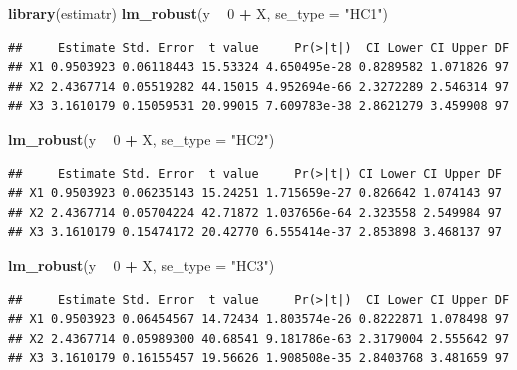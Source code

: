 \documentclass[]{article}
\newenvironment{Shaded}{\begin{snugshade}}{\end{snugshade}}
\newcommand{\DataTypeTok}[1]{\textcolor[rgb]{0.13,0.29,0.53}{#1}}
\newcommand{\DecValTok}[1]{\textcolor[rgb]{0.00,0.00,0.81}{#1}}
\newcommand{\KeywordTok}[1]{\textcolor[rgb]{0.13,0.29,0.53}{\textbf{#1}}}
\newcommand{\NormalTok}[1]{#1}
\newcommand{\OperatorTok}[1]{\textcolor[rgb]{0.81,0.36,0.00}{\textbf{#1}}}
\newcommand{\StringTok}[1]{\textcolor[rgb]{0.31,0.60,0.02}{#1}}
\begin{document}
\begin{Shaded}
\begin{Highlighting}[]
\KeywordTok{library}\NormalTok{(estimatr)}
\KeywordTok{lm_robust}\NormalTok{(y }\OperatorTok{~}\StringTok{ }\DecValTok{0} \OperatorTok{+}\StringTok{ }\NormalTok{X, }\DataTypeTok{se_type =} \StringTok{"HC1"}\NormalTok{)}
\end{Highlighting}
\end{Shaded}

\begin{verbatim}
##     Estimate Std. Error  t value     Pr(>|t|)  CI Lower CI Upper DF
## X1 0.9503923 0.06118443 15.53324 4.650495e-28 0.8289582 1.071826 97
## X2 2.4367714 0.05519282 44.15015 4.952694e-66 2.3272289 2.546314 97
## X3 3.1610179 0.15059531 20.99015 7.609783e-38 2.8621279 3.459908 97
\end{verbatim}

\begin{Shaded}
\begin{Highlighting}[]
\KeywordTok{lm_robust}\NormalTok{(y }\OperatorTok{~}\StringTok{ }\DecValTok{0} \OperatorTok{+}\StringTok{ }\NormalTok{X, }\DataTypeTok{se_type =} \StringTok{"HC2"}\NormalTok{)}
\end{Highlighting}
\end{Shaded}

\begin{verbatim}
##     Estimate Std. Error  t value     Pr(>|t|) CI Lower CI Upper DF
## X1 0.9503923 0.06235143 15.24251 1.715659e-27 0.826642 1.074143 97
## X2 2.4367714 0.05704224 42.71872 1.037656e-64 2.323558 2.549984 97
## X3 3.1610179 0.15474172 20.42770 6.555414e-37 2.853898 3.468137 97
\end{verbatim}

\begin{Shaded}
\begin{Highlighting}[]
\KeywordTok{lm_robust}\NormalTok{(y }\OperatorTok{~}\StringTok{ }\DecValTok{0} \OperatorTok{+}\StringTok{ }\NormalTok{X, }\DataTypeTok{se_type =} \StringTok{"HC3"}\NormalTok{)}
\end{Highlighting}
\end{Shaded}

\begin{verbatim}
##     Estimate Std. Error  t value     Pr(>|t|)  CI Lower CI Upper DF
## X1 0.9503923 0.06454567 14.72434 1.803574e-26 0.8222871 1.078498 97
## X2 2.4367714 0.05989300 40.68541 9.181786e-63 2.3179004 2.555642 97
## X3 3.1610179 0.16155457 19.56626 1.908508e-35 2.8403768 3.481659 97
\end{verbatim}
\end{document}
